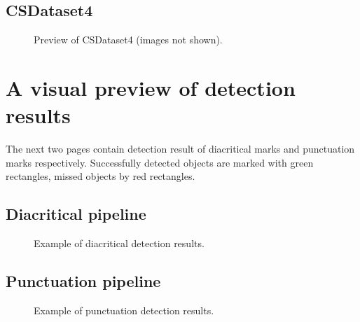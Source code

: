 \documentclass[12pt,a4paper]{report}
\begin{document}
\section{CSDataset4}
\begin{figure}[htbp]
    \centering
    \caption{Preview of CSDataset4 (images not shown).}
    \label{fig:dataset4-preview}
\end{figure}

\chapter{A visual preview of detection results}
The next two pages contain detection result of diacritical marks and punctuation marks respectively. Successfully detected objects are marked with green rectangles, missed objects by red rectangles.

\section{Diacritical pipeline}
\begin{figure}[htbp]
    \centering
    \caption{Example of diacritical detection results.}
    \label{fig:diacritic-results}
\end{figure}

\section{Punctuation pipeline}
\begin{figure}[htbp]
    \centering
    \caption{Example of punctuation detection results.}
    \label{fig:punctuation-results}
\end{figure}
\end{document}
